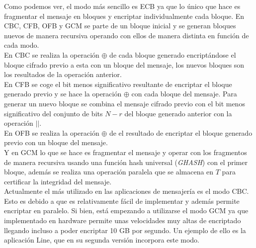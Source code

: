 Como podemos ver, el modo más sencillo es ECB ya que lo único que hace es fragmentar el mensaje en bloques y encriptar individualmente cada bloque. En CBC, CFB, OFB y GCM se parte de un bloque inicial y se generan bloques nuevos de manera recursiva operando con ellos de manera distinta en función de cada modo.\\ 
En CBC se realiza la operación $\oplus$ de cada bloque generado encriptándose el bloque cifrado previo a esta con un bloque del mensaje, los nuevos bloques son los resultados de la operación anterior.\\
En CFB se coge el bit menos significativo resultante de encriptar el bloque generado previo y se hace la operación $\oplus$ con cada bloque del mensaje. Para generar un nuevo bloque se combina el mensaje cifrado previo con el bit menos significativo del conjunto de bits $N-r$ del bloque generado anterior con la operación $||$.\\
En OFB se realiza la operación $\oplus$ de el resultado de encriptar el bloque generado previo con un bloque del mensaje.\\
Y en GCM lo que se hace es fragmentar el mensaje y operar con los fragmentos de manera recursiva usando una función hash universal (\emph{GHASH}) con el primer bloque, además se realiza una operación paralela que se almacena en $T$ para certificar la integridad del mensaje.\\
Actualmente el más utilizado en las aplicaciones de mensajería es el modo CBC. Esto es debido a que es relativamente fácil de implementar y además permite encriptar en paralelo. Si bien, está empezando a utilizarse el modo GCM ya que implementado en hardware permite unas velocidades muy altas de encriptado llegando incluso a poder encriptar 10 GB por segundo. Un ejemplo de ello es la aplicación Line, que en su segunda versión incorpora este modo. 

